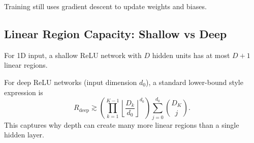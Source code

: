 Training still uses gradient descent to update weights and biases.

\subsection{Linear Region Capacity: Shallow vs Deep}
For 1D input, a shallow ReLU network with $D$ hidden units has at most $D+1$
linear regions.

For deep ReLU networks (input dimension $d_0$), a standard lower-bound style
expression is
\[
R_{\text{deep}}
\gtrsim
\left(\prod_{k=1}^{K-1}\left\lfloor\frac{D_k}{d_0}\right\rfloor^{d_0}\right)
\sum_{j=0}^{d_0}\binom{D_K}{j}.
\]
This captures why depth can create many more linear regions than a single hidden
layer.
